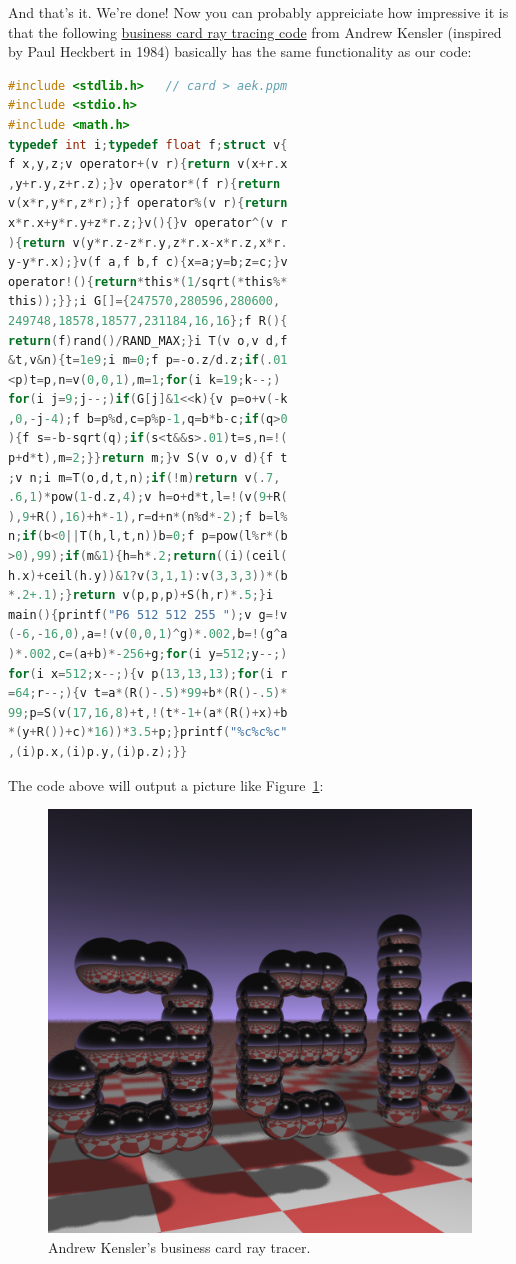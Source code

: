 And that's it. We're done! Now you can probably appreiciate how impressive it is that the following \href{https://fabiensanglard.net/rayTracing_back_of_business_card/}{business card ray tracing code} from Andrew Kensler (inspired by Paul Heckbert in 1984) basically has the same functionality as our code:
\begin{lstlisting}[language=C]
#include <stdlib.h>   // card > aek.ppm
#include <stdio.h>
#include <math.h>
typedef int i;typedef float f;struct v{
f x,y,z;v operator+(v r){return v(x+r.x
,y+r.y,z+r.z);}v operator*(f r){return
v(x*r,y*r,z*r);}f operator%(v r){return
x*r.x+y*r.y+z*r.z;}v(){}v operator^(v r
){return v(y*r.z-z*r.y,z*r.x-x*r.z,x*r.
y-y*r.x);}v(f a,f b,f c){x=a;y=b;z=c;}v
operator!(){return*this*(1/sqrt(*this%*
this));}};i G[]={247570,280596,280600,
249748,18578,18577,231184,16,16};f R(){
return(f)rand()/RAND_MAX;}i T(v o,v d,f
&t,v&n){t=1e9;i m=0;f p=-o.z/d.z;if(.01
<p)t=p,n=v(0,0,1),m=1;for(i k=19;k--;)
for(i j=9;j--;)if(G[j]&1<<k){v p=o+v(-k
,0,-j-4);f b=p%d,c=p%p-1,q=b*b-c;if(q>0
){f s=-b-sqrt(q);if(s<t&&s>.01)t=s,n=!(
p+d*t),m=2;}}return m;}v S(v o,v d){f t
;v n;i m=T(o,d,t,n);if(!m)return v(.7,
.6,1)*pow(1-d.z,4);v h=o+d*t,l=!(v(9+R(
),9+R(),16)+h*-1),r=d+n*(n%d*-2);f b=l%
n;if(b<0||T(h,l,t,n))b=0;f p=pow(l%r*(b
>0),99);if(m&1){h=h*.2;return((i)(ceil(
h.x)+ceil(h.y))&1?v(3,1,1):v(3,3,3))*(b
*.2+.1);}return v(p,p,p)+S(h,r)*.5;}i
main(){printf("P6 512 512 255 ");v g=!v
(-6,-16,0),a=!(v(0,0,1)^g)*.002,b=!(g^a
)*.002,c=(a+b)*-256+g;for(i y=512;y--;)
for(i x=512;x--;){v p(13,13,13);for(i r
=64;r--;){v t=a*(R()-.5)*99+b*(R()-.5)*
99;p=S(v(17,16,8)+t,!(t*-1+(a*(R()+x)+b
*(y+R())+c)*16))*3.5+p;}printf("%c%c%c"
,(i)p.x,(i)p.y,(i)p.z);}}
\end{lstlisting}

The code above will output a picture like Figure~\ref{fig:business_card}:
\begin{figure}[ht]
    \centering
    \includegraphics[width=0.4\linewidth]{imgs/minray.png}
    \caption{Andrew Kensler's business card ray tracer.}
    \label{fig:business_card}
\end{figure}

